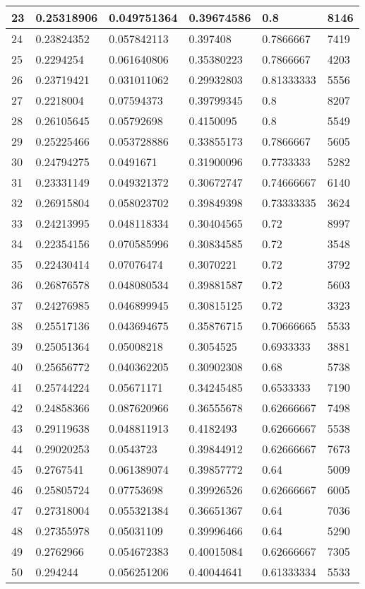 \begin{longtable}{|l|l|l|l|l|l|}
23 & 0.25318906 & 0.049751364 & 0.39674586 & 0.8 & 8146 \\ \hline 
24 & 0.23824352 & 0.057842113 & 0.397408 & 0.7866667 & 7419 \\ \hline 
25 & 0.2294254 & 0.061640806 & 0.35380223 & 0.7866667 & 4203 \\ \hline 
26 & 0.23719421 & 0.031011062 & 0.29932803 & 0.81333333 & 5556 \\ \hline 
27 & 0.2218004 & 0.07594373 & 0.39799345 & 0.8 & 8207 \\ \hline 
28 & 0.26105645 & 0.05792698 & 0.4150095 & 0.8 & 5549 \\ \hline 
29 & 0.25225466 & 0.053728886 & 0.33855173 & 0.7866667 & 5605 \\ \hline 
30 & 0.24794275 & 0.0491671 & 0.31900096 & 0.7733333 & 5282 \\ \hline 
31 & 0.23331149 & 0.049321372 & 0.30672747 & 0.74666667 & 6140 \\ \hline 
32 & 0.26915804 & 0.058023702 & 0.39849398 & 0.73333335 & 3624 \\ \hline 
33 & 0.24213995 & 0.048118334 & 0.30404565 & 0.72 & 8997 \\ \hline 
34 & 0.22354156 & 0.070585996 & 0.30834585 & 0.72 & 3548 \\ \hline 
35 & 0.22430414 & 0.07076474 & 0.3070221 & 0.72 & 3792 \\ \hline 
36 & 0.26876578 & 0.048080534 & 0.39881587 & 0.72 & 5603 \\ \hline 
37 & 0.24276985 & 0.046899945 & 0.30815125 & 0.72 & 3323 \\ \hline 
38 & 0.25517136 & 0.043694675 & 0.35876715 & 0.70666665 & 5533 \\ \hline 
39 & 0.25051364 & 0.05008218 & 0.3054525 & 0.6933333 & 3881 \\ \hline 
40 & 0.25656772 & 0.040362205 & 0.30902308 & 0.68 & 5738 \\ \hline 
41 & 0.25744224 & 0.05671171 & 0.34245485 & 0.6533333 & 7190 \\ \hline 
42 & 0.24858366 & 0.087620966 & 0.36555678 & 0.62666667 & 7498 \\ \hline 
43 & 0.29119638 & 0.048811913 & 0.4182493 & 0.62666667 & 5538 \\ \hline 
44 & 0.29020253 & 0.0543723 & 0.39844912 & 0.62666667 & 7673 \\ \hline 
45 & 0.2767541 & 0.061389074 & 0.39857772 & 0.64 & 5009 \\ \hline 
46 & 0.25805724 & 0.07753698 & 0.39926526 & 0.62666667 & 6005 \\ \hline 
47 & 0.27318004 & 0.055321384 & 0.36651367 & 0.64 & 7036 \\ \hline 
48 & 0.27355978 & 0.05031109 & 0.39996466 & 0.64 & 5290 \\ \hline 
49 & 0.2762966 & 0.054672383 & 0.40015084 & 0.62666667 & 7305 \\ \hline 
50 & 0.294244 & 0.056251206 & 0.40044641 & 0.61333334 & 5533 \\ \hline 
\end{longtable}